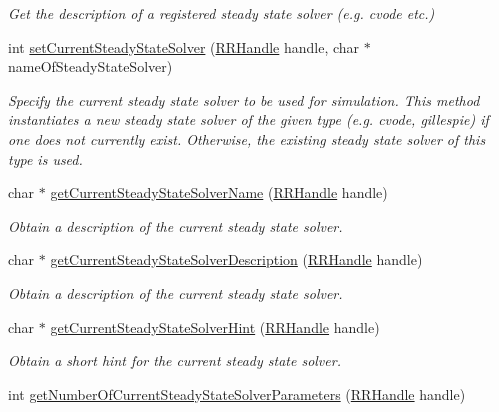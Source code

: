 \begin{DoxyCompactItemize}
\begin{DoxyCompactList}\small\item\em Get the description of a registered steady state solver (e.\+g. cvode etc.) \end{DoxyCompactList}\item 
int \hyperlink{group__simopts_ga3f75fb22d03a7f532bedf31d45a791be}{set\+Current\+Steady\+State\+Solver} (\hyperlink{rrc__types_8h_a1d68f0592372208fa5a5f2799ea4b3ae}{R\+R\+Handle} handle, char $\ast$name\+Of\+Steady\+State\+Solver)
\begin{DoxyCompactList}\small\item\em Specify the current steady state solver to be used for simulation.  This method instantiates a new steady state solver of the given type (e.\+g. cvode, gillespie) if one does not currently exist. Otherwise, the existing steady state solver of this type is used. \end{DoxyCompactList}\item 
char $\ast$ \hyperlink{group__simopts_gac0d4601ea3af03c7c15353bb10bbd95f}{get\+Current\+Steady\+State\+Solver\+Name} (\hyperlink{rrc__types_8h_a1d68f0592372208fa5a5f2799ea4b3ae}{R\+R\+Handle} handle)
\begin{DoxyCompactList}\small\item\em Obtain a description of the current steady state solver. \end{DoxyCompactList}\item 
char $\ast$ \hyperlink{group__simopts_ga408c62750f0976ed81a84fbeb77980df}{get\+Current\+Steady\+State\+Solver\+Description} (\hyperlink{rrc__types_8h_a1d68f0592372208fa5a5f2799ea4b3ae}{R\+R\+Handle} handle)
\begin{DoxyCompactList}\small\item\em Obtain a description of the current steady state solver. \end{DoxyCompactList}\item 
char $\ast$ \hyperlink{group__simopts_ga7e0bc7da3c46b6869fc086ccea75d052}{get\+Current\+Steady\+State\+Solver\+Hint} (\hyperlink{rrc__types_8h_a1d68f0592372208fa5a5f2799ea4b3ae}{R\+R\+Handle} handle)
\begin{DoxyCompactList}\small\item\em Obtain a short hint for the current steady state solver. \end{DoxyCompactList}\item 
int \hyperlink{group__simopts_ga669437dfce773b8fa6f72bd3d26748b0}{get\+Number\+Of\+Current\+Steady\+State\+Solver\+Parameters} (\hyperlink{rrc__types_8h_a1d68f0592372208fa5a5f2799ea4b3ae}{R\+R\+Handle} handle)

\end{DoxyCompactItemize}
